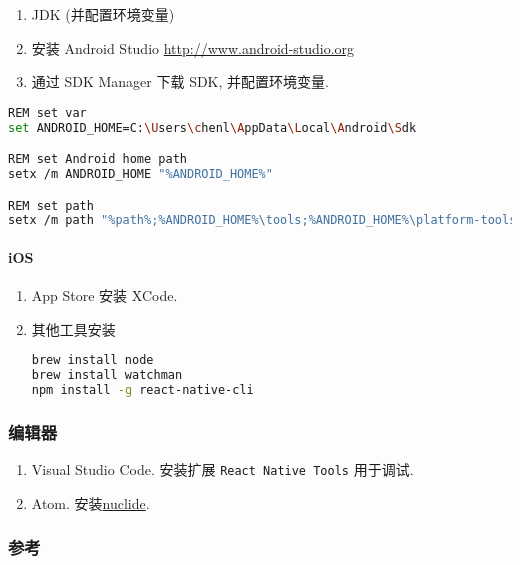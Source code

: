 \begin{enumerate}
\def\labelenumi{\arabic{enumi}.}
\tightlist
\item
  JDK (并配置环境变量)
\item
  安装 Android Studio \url{http://www.android-studio.org}
\item
  通过 SDK Manager 下载 SDK, 并配置环境变量.
\end{enumerate}

\begin{lstlisting}[language=bash]
REM set var
set ANDROID_HOME=C:\Users\chenl\AppData\Local\Android\Sdk

REM set Android home path
setx /m ANDROID_HOME "%ANDROID_HOME%"

REM set path
setx /m path "%path%;%ANDROID_HOME%\tools;%ANDROID_HOME%\platform-tools;"
\end{lstlisting}

\paragraph{iOS}\label{ios}

\begin{enumerate}
\def\labelenumi{\arabic{enumi}.}
\item
  App Store 安装 XCode.
\item
  其他工具安装

\begin{lstlisting}[language=bash]
brew install node
brew install watchman
npm install -g react-native-cli
\end{lstlisting}
\end{enumerate}

\subsubsection{编辑器}\label{ux7f16ux8f91ux5668}

\begin{enumerate}
\def\labelenumi{\arabic{enumi}.}
\tightlist
\item
  Visual Studio Code. 安装扩展 \lstinline!React Native Tools! 用于调试.
\item
  Atom. 安装\href{https://atom.io/packages/nuclide}{nuclide}.
\end{enumerate}

\subsubsection{参考}\label{ux53c2ux8003}


